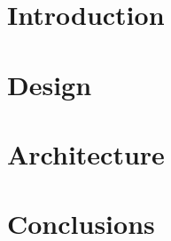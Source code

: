 \documentclass[10pt]{report}
\begin{document}

\restoregeometry

\setcounter{tocdepth}{5}
\tableofcontents
\listoffigures
\listoftables
\pagebreak

\justify

\chapter{Introduction}

\pagebreak

\chapter{Design}

\pagebreak

\chapter{Architecture}

\pagebreak

\chapter{Conclusions}

\pagebreak

\printbibliography
\end{document}
